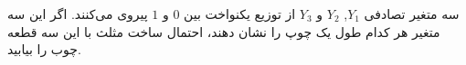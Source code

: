 سه متغیر تصادفی
$ Y_1 $,
$ Y_2 $
 و
$ Y_3 $
 از توزیع یکنواخت بین
$ 0 $
 و
$ 1 $ 
پیروی می‌کنند. اگر این سه متغیر هر کدام طول یک چوپ را نشان دهند، احتمال ساخت مثلث با این سه قطعه چوب را بیابید.